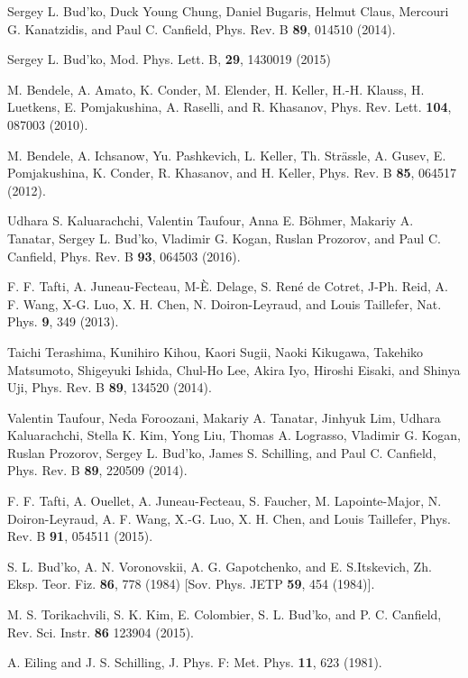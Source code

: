 \documentclass[aps,prb,preprint,groupedaddress,showpacs,amsmath,amssymb]{revtex4}
\begin{document}
\begin{thebibliography}{99}
Sergey L. Bud'ko, Duck Young Chung, Daniel Bugaris, Helmut Claus, Mercouri G. Kanatzidis, and Paul C. Canfield, Phys. Rev. B {\bf 89}, 014510 (2014).

Sergey L. Bud'ko,  Mod. Phys. Lett. B, {\bf 29}, 1430019 (2015)

M. Bendele, A. Amato, K. Conder, M. Elender, H. Keller, H.-H. Klauss, H. Luetkens, E. Pomjakushina, A. Raselli, and R. Khasanov, Phys. Rev. Lett. {\bf 104}, 087003 (2010). 

M. Bendele, A. Ichsanow, Yu. Pashkevich, L. Keller, Th. Strässle, A. Gusev, E. Pomjakushina, K. Conder, R. Khasanov, and H. Keller, Phys. Rev. B {\bf 85}, 064517 (2012).

Udhara S. Kaluarachchi, Valentin Taufour, Anna E. B\"ohmer, Makariy A. Tanatar, Sergey L. Bud'ko, Vladimir G. Kogan, Ruslan Prozorov, and Paul C. Canfield, Phys. Rev. B {\bf 93}, 064503 (2016).

F. F. Tafti, A. Juneau-Fecteau,	M-\`E. Delage, S. Ren\'e de Cotret, J-Ph. Reid, A. F. Wang, X-G. Luo, X. H. Chen, N. Doiron-Leyraud, and Louis Taillefer, Nat. Phys. {\bf 9}, 349 (2013). 

Taichi Terashima, Kunihiro Kihou, Kaori Sugii, Naoki Kikugawa, Takehiko Matsumoto, Shigeyuki Ishida, Chul-Ho Lee, Akira Iyo, Hiroshi Eisaki, and Shinya Uji, Phys. Rev. B {\bf 89}, 134520 (2014).

Valentin Taufour, Neda Foroozani, Makariy A. Tanatar, Jinhyuk Lim, Udhara Kaluarachchi, Stella K. Kim, Yong Liu, Thomas A. Lograsso, Vladimir G. Kogan, Ruslan Prozorov, Sergey L. Bud'ko, James S. Schilling, and Paul C. Canfield, Phys. Rev. B {\bf 89}, 220509 (2014).

F. F. Tafti, A. Ouellet, A. Juneau-Fecteau, S. Faucher, M. Lapointe-Major, N. Doiron-Leyraud, A. F. Wang, X.-G. Luo, X. H. Chen, and Louis Taillefer, Phys. Rev. B {\bf 91}, 054511 (2015).

S. L. Bud'ko, A. N. Voronovskii, A. G. Gapotchenko, and E. S.Itskevich, Zh. Eksp. Teor. Fiz. {\bf 86}, 778 (1984) [Sov. Phys. JETP {\bf 59}, 454 (1984)].

M. S. Torikachvili,  S. K. Kim,  E. Colombier,  S. L. Bud'ko,  and P. C. Canfield, Rev. Sci. Instr. {\bf 86} 123904 (2015).

A. Eiling and J. S. Schilling, J. Phys. F: Met. Phys. {\bf 11}, 623 (1981).


\end{thebibliography}
\end{document}
